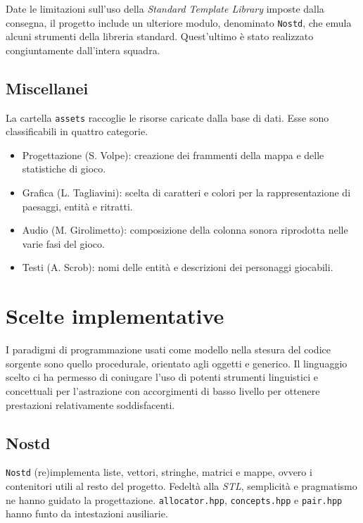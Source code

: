 \documentclass[a4paper]{article}
\begin{document}
Date le limitazioni sull'uso della \emph{Standard Template Library} imposte
dalla consegna, il progetto include un ulteriore modulo, denominato
\verb!Nostd!, che emula alcuni strumenti della libreria standard. Quest'ultimo
\`e stato realizzato congiuntamente dall'intera squadra.

\subsection{Miscellanei}

La cartella \verb!assets! raccoglie le risorse caricate dalla base di dati.
Esse sono classificabili in quattro categorie.

\begin{itemize}
  \item Progettazione (S. Volpe): creazione dei frammenti della mappa e delle
    statistiche di gioco.
  \item Grafica (L. Tagliavini): scelta di caratteri e colori per la
    rappresentazione di paesaggi, entit\`a e ritratti.
  \item Audio (M. Girolimetto): composizione della colonna sonora riprodotta
    nelle varie fasi del gioco.
  \item Testi (A. Scrob): nomi delle entit\`a e descrizioni dei personaggi
    giocabili.
\end{itemize}

\section{Scelte implementative}

I paradigmi di programmazione usati come modello nella stesura del codice
sorgente sono quello procedurale, orientato agli oggetti e generico. Il
linguaggio scelto ci ha permesso di coniugare l'uso di potenti strumenti
linguistici e concettuali per l'astrazione con accorgimenti di basso livello
per ottenere prestazioni relativamente soddisfacenti.

\subsection{Nostd}

\verb!Nostd! (re)implementa liste, vettori, stringhe, matrici e mappe, ovvero i
contenitori utili al resto del progetto. Fedelt\`a alla \emph{STL},
semplicit\`a e pragmatismo ne hanno guidato la progettazione.
\verb!allocator.hpp!, \verb!concepts.hpp! e \verb!pair.hpp! hanno funto da
intestazioni ausiliarie.
\end{document}
